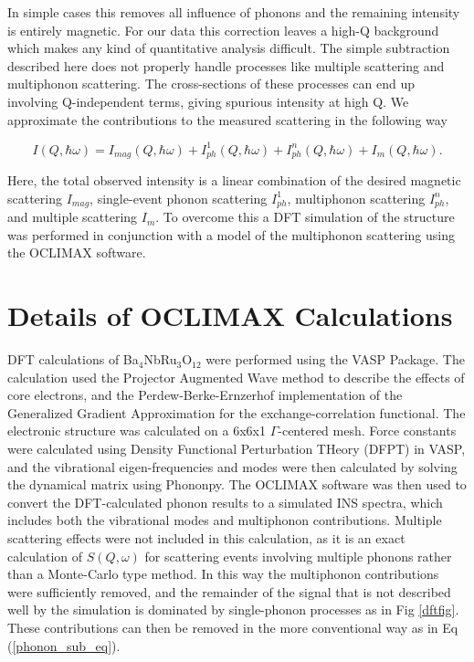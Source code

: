 \documentclass[%
 reprint,
superscriptaddress,
 amsmath,amssymb,
 aps,
 prb,
]{revtex4-2}
\begin{document}
In simple cases this removes all influence of phonons and the remaining intensity is entirely magnetic. For our data this correction leaves a high-Q background which makes any kind of quantitative analysis difficult. The simple subtraction described here does not properly handle processes like multiple scattering and multiphonon scattering. The cross-sections of these processes can end up involving Q-independent terms, giving spurious intensity at high Q. We approximate the contributions to the measured scattering in the following way

\begin{equation}
\label{eq:bnro_scatter_contribs}
I(Q,\hbar\omega) = I_{mag}(Q,\hbar\omega) + I_{ph}^1(Q,\hbar\omega) + I_{ph}^{n}(Q,\hbar\omega) + I_{m}(Q,\hbar\omega).
\end{equation}

Here, the total observed intensity is a linear combination of the desired magnetic scattering $I_{mag}$, single-event phonon scattering $I_{ph}^1$, multiphonon scattering $I_{ph}^n$, and multiple scattering $I_{m}$. 
To overcome this a DFT simulation of the structure was performed in conjunction with a model of the multiphonon scattering using the OCLIMAX software.



\section{Details of OCLIMAX Calculations}
\label{sec:oclimax}
DFT calculations of Ba$_4$NbRu$_3$O$_{12}$ were performed using the VASP Package\cite{Kresse1996EfficientSet}. The calculation used the Projector Augmented Wave\cite{Blochl1994ProjectorMethod,Kresse1999FromMethod} method to describe the effects of core electrons, and the Perdew-Berke-Ernzerhof\cite{Perdew1996GeneralizedSimple} implementation of the Generalized Gradient Approximation for the exchange-correlation functional. The electronic structure was calculated on a 6x6x1 $\Gamma$-centered mesh. Force constants were calculated using Density Functional Perturbation THeory (DFPT) in VASP, and the vibrational eigen-frequencies and modes were then calculated by solving the dynamical matrix using Phononpy\cite{Togo2015FirstScience}. The OCLIMAX\cite{Cheng2019SimulationOCLIMAX} software was then used to convert the DFT-calculated phonon results to a simulated INS spectra, which includes both the vibrational modes and multiphonon contributions. Multiple scattering effects were not included in this calculation, as it is an exact calculation of $S(Q,\omega)$ for scattering events involving multiple phonons rather than a Monte-Carlo type method. In this way the multiphonon contributions were sufficiently removed, and the remainder of the signal that is not described well by the simulation is dominated by single-phonon processes as in Fig \ref{dftfig}. These contributions can then be removed in the more conventional way as in Eq (\ref{phonon_sub_eq}). 
\end{document}
